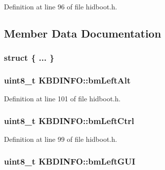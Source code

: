 \-Definition at line 96 of file hidboot.\-h.



\subsection{\-Member \-Data \-Documentation}
\hypertarget{struct_k_b_d_i_n_f_o_a4471a2163a160acd4c54e7897f970ec5}{\subsubsection[{"@6}]{\setlength{\rightskip}{0pt plus 5cm}struct \{ ... \} }}\label{struct_k_b_d_i_n_f_o_a4471a2163a160acd4c54e7897f970ec5}
\hypertarget{struct_k_b_d_i_n_f_o_a7e0966433308d3ef40434a7352b4e6f1}{
\subsubsection[{bm\-Left\-Alt}]{\setlength{\rightskip}{0pt plus 5cm}uint8\-\_\-t {\bf \-K\-B\-D\-I\-N\-F\-O\-::bm\-Left\-Alt}}}\label{struct_k_b_d_i_n_f_o_a7e0966433308d3ef40434a7352b4e6f1}


\-Definition at line 101 of file hidboot.\-h.

\hypertarget{struct_k_b_d_i_n_f_o_a08fcf2c3356d92c48da5e0df455685a7}{
\subsubsection[{bm\-Left\-Ctrl}]{\setlength{\rightskip}{0pt plus 5cm}uint8\-\_\-t {\bf \-K\-B\-D\-I\-N\-F\-O\-::bm\-Left\-Ctrl}}}\label{struct_k_b_d_i_n_f_o_a08fcf2c3356d92c48da5e0df455685a7}


\-Definition at line 99 of file hidboot.\-h.

\hypertarget{struct_k_b_d_i_n_f_o_a395dd36b5d26b2fa19eca4216710ea83}{
\subsubsection[{bm\-Left\-G\-U\-I}]{\setlength{\rightskip}{0pt plus 5cm}uint8\-\_\-t {\bf \-K\-B\-D\-I\-N\-F\-O\-::bm\-Left\-G\-U\-I}}}\label{struct_k_b_d_i_n_f_o_a395dd36b5d26b2fa19eca4216710ea83}


